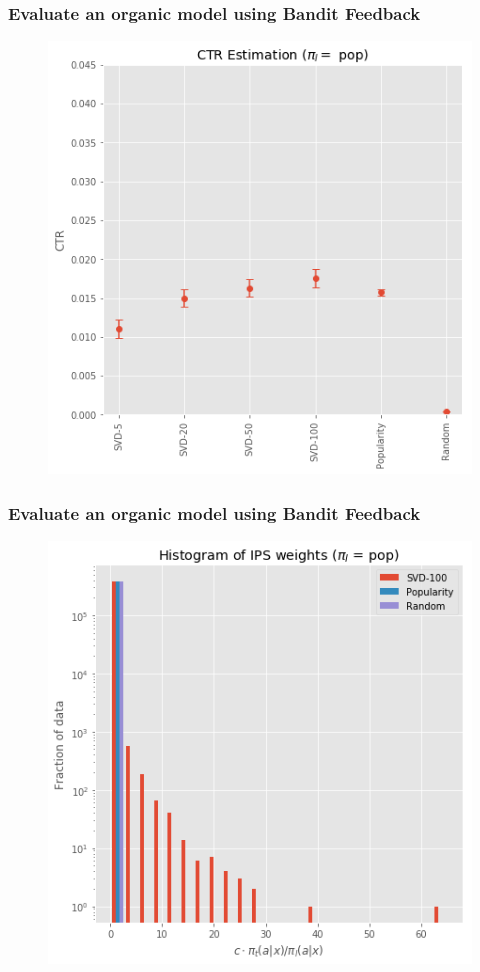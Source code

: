\begin{frame}
  \frametitle{Evaluate an organic model using Bandit Feedback}
\begin{figure}[h!]
\includegraphics[scale=0.4]{images/evalorganicwithbandit5.png}
\centering
\label{motex1}
\end{figure}
\end{frame}

\begin{frame}
  \frametitle{Evaluate an organic model using Bandit Feedback}
\begin{figure}[h!]
\includegraphics[scale=0.4]{images/evalorganicwithbandit6.png}
\centering
\label{motex1}
\end{figure}
\end{frame}


